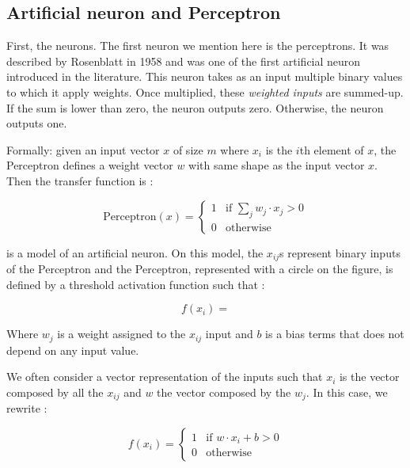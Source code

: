 	\subsection{Artificial neuron and Perceptron}
	\label{sec:Artificial_neurons}
		First, the neurons. The first neuron we mention here is the perceptrons. It was described by Rosenblatt in 1958 \cite{rosenblatt1958perceptron} and was one of the first artificial neuron introduced in the literature. This neuron takes as an input multiple binary values to which it apply weights. Once multiplied, these \textit{weighted inputs} are summed-up. If the sum is lower than zero, the neuron outputs zero. Otherwise, the neuron outputs one. 

		Formally: given an input vector $x$ of size $m$ where $x_i$ is the $i$th element of $x$, the Perceptron defines a weight vector $w$ with same shape as the input vector $x$. Then the transfer function is :

		$$ \text{Perceptron}(x) = \begin{cases}1 & \text{if } \sum_j w_j \cdot x_j > 0\\0 & \text{otherwise}\end{cases} $$

		  is a model of an artificial neuron. On this model, the $x_{ij}$s represent binary inputs of the Perceptron and the Perceptron, represented with a circle on the figure, is defined by a threshold activation function such that :

		$$ f(x_i) =   $$ 

		Where $w_j$ is a weight assigned to the $x_{ij}$ input and $b$ is a bias terms that does not depend on any input value.

		We often consider a vector representation of the inputs such that $x_i$ is the vector composed by all the $x_{ij}$ and $w$ the vector composed by the $w_j$. In this case, we rewrite : 

		$$ f(x_i) = \begin{cases}1 & \text{if } w \cdot x_i + b > 0\\0 & \text{otherwise}\end{cases}  $$


